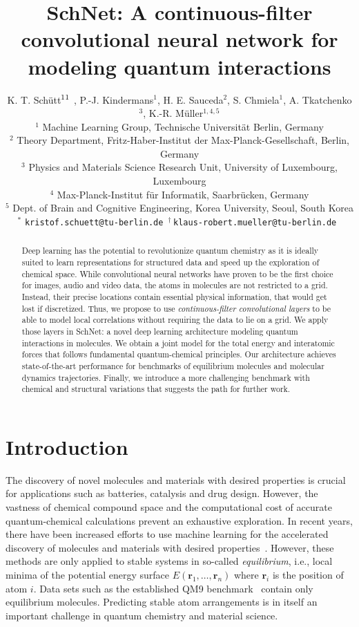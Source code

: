 \documentclass{article}
\title{SchNet: A continuous-filter convolutional neural network for modeling quantum interactions}
\author{
  K. T. Schütt$^1\footnotemark$ ,
  P.-J. Kindermans$^1$,
  H. E. Sauceda$^2$,
  S. Chmiela$^1$,
  A. Tkatchenko$^3$,
  K.-R. Müller$^{1,4,5}$\footnotemark \\
  $^1$ Machine Learning Group, Technische Universität Berlin, Germany \\
  $^2$ Theory Department, Fritz-Haber-Institut der Max-Planck-Gesellschaft, Berlin, Germany\\
  $^3$ Physics and Materials Science Research Unit, University of Luxembourg, Luxembourg\\
  $^4$ Max-Planck-Institut für Informatik, Saarbrücken, Germany\\
  $^5$ Dept. of Brain and Cognitive Engineering, Korea University, Seoul, South Korea\\
  $^*$ \tt{kristof.schuett@tu-berlin.de}
  $^\dagger\,$\tt{klaus-robert.mueller@tu-berlin.de}
}
\newcommand{\rr}{\mathbf{r}}
\begin{document}
\maketitle


\begin{abstract}
Deep learning has the potential to revolutionize quantum chemistry as it is ideally suited to learn representations for structured data and speed up the exploration of chemical space.
While convolutional neural networks have proven to be the first choice for images, audio and video data, the atoms in molecules are not restricted to a grid.
Instead, their precise locations contain essential physical information, that would get lost if discretized.
Thus, we propose to use \textit{continuous-filter convolutional layers} to be able to model local correlations without requiring the data to lie on a grid.
We apply those layers in SchNet: a novel deep learning architecture modeling quantum interactions in molecules.
We obtain a joint model for the total energy and interatomic forces that follows fundamental quantum-chemical principles.
Our architecture achieves state-of-the-art performance for benchmarks of equilibrium molecules and molecular dynamics trajectories.
Finally, we introduce a more challenging benchmark with chemical and structural variations that suggests the path for further work.




\end{abstract}

\section{Introduction}

The discovery of novel molecules and materials with desired properties is crucial for applications such as batteries, catalysis and drug design.
However, the vastness of chemical compound space and the computational cost of accurate quantum-chemical calculations prevent an exhaustive exploration.
In recent years, there have been increased efforts to use machine learning for the accelerated discovery of molecules and materials with desired properties~\citep{rupp2012fast,montavon2013machine,hansen2013assessment,schutt2014represent,Hansen-JCPL,faber2017fast,brockherde2017bypassing,boomsma2017spherical,eickenberg2017scattering}.
However, these methods are only applied to stable systems in so-called \emph{equilibrium}, i.e., local minima of the potential energy surface $E(\rr_1, \dots, \rr_n)$ where $\rr_i$ is the position of atom $i$.
Data sets such as the established QM9 benchmark~\citep{ramakrishnan2014quantum} contain only equilibrium molecules.
Predicting stable atom arrangements is in itself an important challenge in quantum chemistry and material science.
\end{document}
